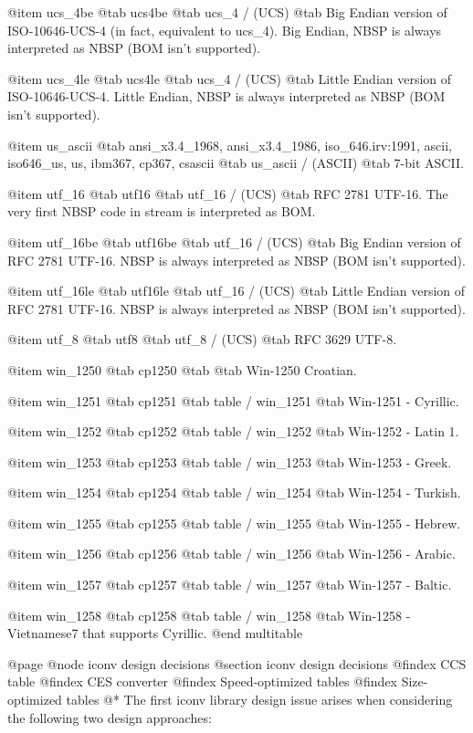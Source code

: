 @item
ucs_4be
@tab
ucs4be
@tab
ucs_4 / (UCS)
@tab
Big Endian version of ISO-10646-UCS-4 (in fact, equivalent to ucs_4).
Big Endian, NBSP is always interpreted as NBSP (BOM isn't supported).


@item
ucs_4le
@tab
ucs4le
@tab
ucs_4 / (UCS)
@tab
Little Endian version of ISO-10646-UCS-4.
Little Endian, NBSP is always interpreted as NBSP (BOM isn't supported).


@item
us_ascii
@tab
ansi_x3.4_1968, ansi_x3.4_1986, iso_646.irv:1991, ascii, iso646_us, us, ibm367, cp367, csascii
@tab
us_ascii / (ASCII)
@tab
7-bit ASCII.


@item
utf_16
@tab
utf16
@tab
utf_16 / (UCS)
@tab
RFC 2781 UTF-16. The very first NBSP code in stream is interpreted as BOM.


@item
utf_16be
@tab
utf16be
@tab
utf_16 / (UCS)
@tab
Big Endian version of RFC 2781 UTF-16.
NBSP is always interpreted as NBSP (BOM isn't supported).


@item
utf_16le
@tab
utf16le
@tab
utf_16 / (UCS)
@tab
Little Endian version of RFC 2781 UTF-16.
NBSP is always interpreted as NBSP (BOM isn't supported).


@item
utf_8
@tab
utf8
@tab
utf_8 / (UCS)
@tab
RFC 3629 UTF-8.


@item
win_1250
@tab
cp1250
@tab
@tab
Win-1250 Croatian.


@item
win_1251
@tab
cp1251
@tab
table / win_1251
@tab
Win-1251 - Cyrillic.


@item
win_1252
@tab
cp1252
@tab
table / win_1252
@tab
Win-1252 - Latin 1.


@item
win_1253
@tab
cp1253
@tab
table / win_1253
@tab
Win-1253 - Greek.


@item
win_1254
@tab
cp1254
@tab
table / win_1254
@tab
Win-1254 - Turkish.


@item
win_1255
@tab
cp1255
@tab
table / win_1255
@tab
Win-1255 - Hebrew.


@item
win_1256
@tab
cp1256
@tab
table / win_1256
@tab
Win-1256 - Arabic.


@item
win_1257
@tab
cp1257
@tab
table / win_1257
@tab
Win-1257 - Baltic.


@item
win_1258
@tab
cp1258
@tab
table / win_1258
@tab
Win-1258 - Vietnamese7 that supports Cyrillic.
@end multitable





@page
@node iconv design decisions
@section iconv design decisions
@findex CCS table
@findex CES converter
@findex Speed-optimized tables
@findex Size-optimized tables
@*
The first iconv library design issue arises when considering the
following two design approaches:

